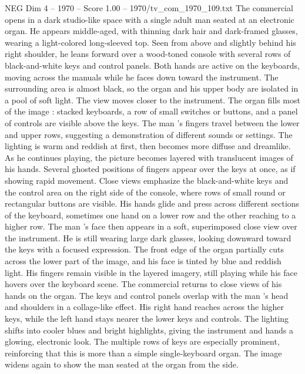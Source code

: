 \begin{textsample}{NEG Dim 4 – 1970 – Score 1.00 – 1970/tv\_com\_1970\_109.txt}  \label{ex:f4_neg_012}
The commercial opens in a dark studio-like space with a single adult man seated at an electronic organ.
He appears middle-aged, with thinning dark hair and dark-framed glasses, wearing a light-colored long-sleeved top.
Seen from above and slightly behind his right shoulder, he leans forward over a wood-toned console with several rows of black-and-white keys and control panels.
Both hands are active on the keyboards, moving across the manuals while he faces down toward the instrument.
The surrounding area is almost black, so the organ and his upper body are isolated in a pool of soft light.
The view moves closer to the instrument.
The organ fills most of the image : stacked keyboards, a row of small switches or buttons, and a panel of controls are visible above the keys.
The man ’s fingers travel between the lower and upper rows, suggesting a demonstration of different sounds or settings.
The lighting is warm and reddish at first, then becomes more diffuse and dreamlike.
As he continues playing, the picture becomes layered with translucent images of his hands.
Several ghosted positions of fingers appear over the keys at once, as if showing rapid movement.
Close views emphasize the black-and-white keys and the control area on the right side of the console, where rows of small round or rectangular buttons are visible.
His hands glide and press across different sections of the keyboard, sometimes one hand on a lower row and the other reaching to a higher row.
The man ’s face then appears in a soft, superimposed close view over the instrument.
He is still wearing large dark glasses, looking downward toward the keys with a focused expression.
The front edge of the organ partially cuts across the lower part of the image, and his face is tinted by blue and reddish light.
His fingers remain visible in the layered imagery, still playing while his face hovers over the keyboard scene.
The commercial returns to close views of his hands on the organ.
The keys and control panels overlap with the man ’s head and shoulders in a collage-like effect.
His right hand reaches across the higher keys, while the left hand stays nearer the lower keys and controls.
The lighting shifts into cooler blues and bright highlights, giving the instrument and hands a glowing, electronic look.
The multiple rows of keys are especially prominent, reinforcing that this is more than a simple single-keyboard organ.
The image widens again to show the man seated at the organ from the side.

\end{textsample}
